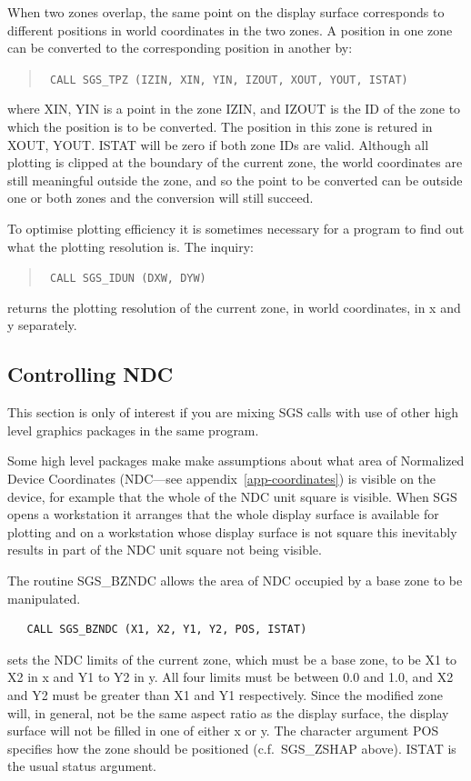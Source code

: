 \documentclass[11pt]{article}
\newcommand{\hyperref}[4]{#2\ref{#4}#3}
\newcommand{\htmlref}[2]{#1}
\begin{document}
When two zones overlap, the same point on the display surface corresponds to
different positions in world coordinates in the two zones. A position in one
zone can be converted to the corresponding position in another by:
\begin{quote}{\tt
    CALL \htmlref{SGS\_TPZ}{SGS_TPZ} (IZIN, XIN, YIN, IZOUT, XOUT, YOUT, ISTAT)}
\end{quote}
where XIN, YIN is a point in the zone IZIN, and IZOUT is the ID of the zone to
which the position is to be converted.  The position in this zone is retured
in XOUT, YOUT. ISTAT will be zero if both zone IDs are valid.  Although all
plotting is clipped at the boundary of the current zone, the world coordinates
are still meaningful outside the zone, and so the point to be converted can
be outside one or both zones and the conversion will still succeed.

To optimise plotting efficiency it is sometimes
necessary for a program to find out what the
plotting resolution is.  The inquiry:
\begin{quote}{\tt
    CALL \htmlref{SGS\_IDUN}{SGS_IDUN} (DXW, DYW)}
\end{quote}
returns the plotting resolution of the current zone, in
world coordinates, in x and y separately.

\subsection {Controlling NDC}

This section is only of interest if you are mixing SGS calls with use of other
high level graphics packages in the same program.

Some high level packages make make assumptions about what area of Normalized
Device Coordinates (NDC---see
\hyperref{this appendix}{appendix~}{}{app-coordinates}) is visible on the
device, for example that the whole of the NDC unit square is visible. When SGS
opens a workstation it arranges that the whole display surface is available for
plotting and on a workstation whose display surface is not square  this
inevitably results in part of the NDC unit square not being visible.

The routine \htmlref{SGS\_BZNDC}{SGS_BZNDC} allows the area of NDC
occupied by a base zone to be manipulated.
\begin{verbatim}
   CALL SGS_BZNDC (X1, X2, Y1, Y2, POS, ISTAT)
\end{verbatim}
sets the NDC limits of the current zone, which must be a base zone, to be X1 to
X2 in x and Y1 to Y2 in y. All four limits must be between 0.0 and 1.0, and X2
and Y2 must be greater than X1 and Y1 respectively. Since the modified zone
will, in general, not be the same aspect ratio as the display surface, the
display surface will not be filled in one of either x or y. The character
argument POS specifies how the zone should be positioned (c.f.\
\htmlref{SGS\_ZSHAP}{SGS_ZSHAP}
above). ISTAT is the usual status argument.
\end{document}

